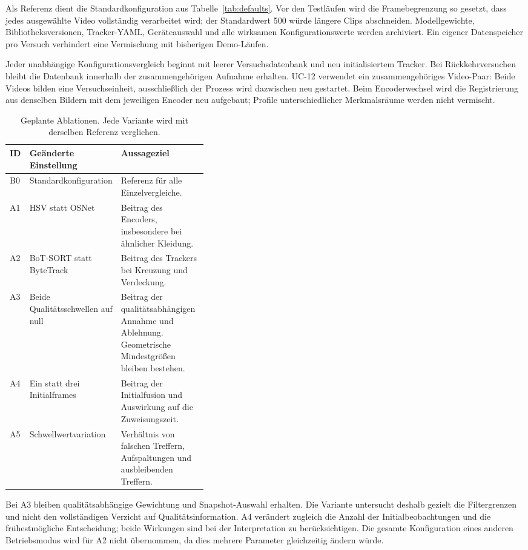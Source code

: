 \documentclass[runningheads]{llncs}
\begin{document}
Als Referenz dient die Standardkonfiguration aus Tabelle~\ref{tab:defaults}. Vor den Testläufen wird die Framebegrenzung so gesetzt, dass jedes ausgewählte Video vollständig verarbeitet wird; der Standardwert 500 würde längere Clips abschneiden. Modellgewichte, Bibliotheksversionen, Tracker-YAML, Geräteauswahl und alle wirksamen Konfigurationswerte werden archiviert. Ein eigener Datenspeicher pro Versuch verhindert eine Vermischung mit bisherigen Demo-Läufen.

Jeder unabhängige Konfigurationsvergleich beginnt mit leerer Versuchsdatenbank und neu initialisiertem Tracker. Bei Rückkehrversuchen bleibt die Datenbank innerhalb der zusammengehörigen Aufnahme erhalten. UC-12 verwendet ein zusammengehöriges Video-Paar: Beide Videos bilden eine Versuchseinheit, ausschließlich der Prozess wird dazwischen neu gestartet. Beim Encoderwechsel wird die Registrierung aus denselben Bildern mit dem jeweiligen Encoder neu aufgebaut; Profile unterschiedlicher Merkmalsräume werden nicht vermischt.

\begin{table}[tbp]
\caption{Geplante Ablationen. Jede Variante wird mit derselben Referenz verglichen.}
\label{tab:eval-ablations}
\centering
\small
\begin{tabularx}{\linewidth}{@{}p{0.10\linewidth}p{0.28\linewidth}X@{}}
\toprule
ID & Geänderte Einstellung & Aussageziel \\
\midrule
B0 & Standardkonfiguration & Referenz für alle Einzelvergleiche. \\
A1 & HSV statt OSNet & Beitrag des Encoders, insbesondere bei ähnlicher Kleidung. \\
A2 & BoT-SORT statt ByteTrack & Beitrag des Trackers bei Kreuzung und Verdeckung. \\
A3 & Beide Qualitätsschwellen auf null & Beitrag der qualitätsabhängigen Annahme und Ablehnung. Geometrische Mindestgrößen bleiben bestehen. \\
A4 & Ein statt drei Initialframes & Beitrag der Initialfusion und Auswirkung auf die Zuweisungszeit. \\
A5 & Schwellwertvariation & Verhältnis von falschen Treffern, Aufspaltungen und ausbleibenden Treffern. \\
\bottomrule
\end{tabularx}
\end{table}

Bei A3 bleiben qualitätsabhängige Gewichtung und Snapshot-Auswahl erhalten. Die Variante untersucht deshalb gezielt die Filtergrenzen und nicht den vollständigen Verzicht auf Qualitätsinformation. A4 verändert zugleich die Anzahl der Initialbeobachtungen und die frühestmögliche Entscheidung; beide Wirkungen sind bei der Interpretation zu berücksichtigen. Die gesamte Konfiguration eines anderen Betriebsmodus wird für A2 nicht übernommen, da dies mehrere Parameter gleichzeitig ändern würde.
\end{document}

